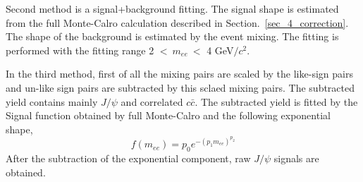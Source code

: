 Second method is a signal+background fitting. 
The signal shape is estimated from the full Monte-Calro calculation described in Section.~\ref{sec_4_correction}. 
The shape of the background is estimated by the event mixing. 
The fitting is performed with the fitting  range 2 $< ~m_{ee}~<$ 4 GeV$/c^{2}$.

In the third method, first of all the mixing pairs are scaled by the like-sign pairs and un-like sign pairs are subtracted by this sclaed mixing pairs. 
The subtracted yield contains mainly $J/\psi$ and correlated $c\bar{c}$.
The subtracted yield is fitted by the Signal function obtained by full Monte-Calro and the following exponential shape, 
\begin{equation}
  f(m_{ee}) = p_{0} e^{-(p_{1}m_{ee})^{p_{2}}}
\end{equation}
After the subtraction of the exponential component, raw $J/\psi$ signals are obtained. 
 

